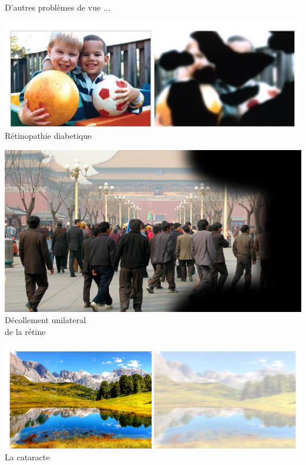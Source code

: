 \documentclass{beamer}
\begin{document}
\begin{frame}
 {D'autres problèmes de vue ... }

 \vskip 0.5cm
 \begin{center}
 \begin{minipage}{0.45\linewidth}
  \centering \includegraphics[width=1\linewidth]{images/visual_problem2.png} \\
  R\'etinopathie diabetique
 \end{minipage} \qquad \pause
 \begin{minipage}{0.45\linewidth}
  \centering \includegraphics[width=1\linewidth]{images/visual_problem3.png} \\
  {\small D\'ecollement unilateral \\ de la r\'etine}
 \end{minipage} \pause \vskip 0.2cm
 \begin{minipage}{0.6\linewidth}
  \centering \includegraphics[width=1\linewidth]{images/visual_problem4.png}
  La cataracte
 \end{minipage}
 \end{center}

\end{frame}
\end{document}
